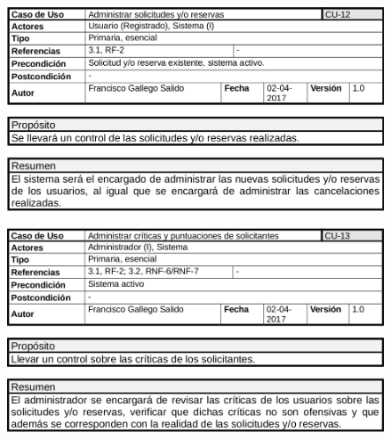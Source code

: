 	\begin{figure}[h!]
		\centering
		\includegraphics[width=0.9\linewidth]{img/casos/solicitudes_reservas/Caso_administrar_solicitudes}
		\label{fig:casoadministrarsolicitudes}
	\end{figure}
\clearpage
	\begin{figure}[h!]
		\centering
		\includegraphics[width=0.9\linewidth]{img/casos/solicitudes_reservas/Caso_administrar_criticas}
		\label{fig:casoadministrarcriticas}
	\end{figure}

